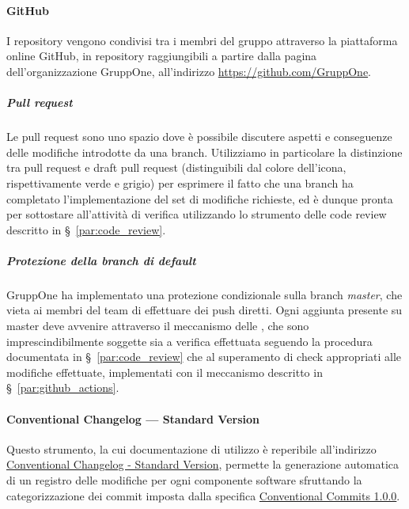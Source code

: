 \documentclass[../../norme-di-progetto.tex]{subfiles}
\begin{document}


\paragraph{GitHub}%
\label{par:github}

I repository vengono condivisi tra i membri del gruppo attraverso la piattaforma online GitHub, in repository raggiungibili a partire dalla pagina dell'organizzazione GruppOne, all'indirizzo \href{https://github.com/GruppOne}{https://github.com/GruppOne}.

\subparagraph{Pull request}%
\label{subp:pull_request}

Le pull request sono uno spazio dove è possibile discutere aspetti e conseguenze delle modifiche introdotte da una branch. Utilizziamo in particolare la distinzione tra pull request e draft pull request (distinguibili dal colore dell'icona, rispettivamente verde e grigio) per esprimere il fatto che una branch ha completato l'implementazione del set di modifiche richieste, ed è dunque pronta per sottostare all'attività di verifica utilizzando lo strumento delle code review descritto in §~\ref{par:code_review}.


\subparagraph{Protezione della branch di default}%
\label{subp:protezione_della_branch_di_default}

GruppOne ha implementato una protezione condizionale sulla branch \textit{master}, che vieta ai membri del team di effettuare dei push diretti. Ogni aggiunta presente su master deve avvenire attraverso il meccanismo delle , che sono imprescindibilmente soggette sia a verifica effettuata seguendo la procedura documentata in §~\ref{par:code_review} che al superamento di check appropriati alle modifiche effettuate, implementati con il meccanismo descritto in §~\ref{par:github_actions}.



\paragraph{Conventional Changelog --- Standard Version}%
\label{par:conventional_changelog_standard_version}

Questo strumento, la cui documentazione di utilizzo è reperibile all'indirizzo \href{https://github.com/conventional-changelog/standard-version/blob/master/README.md}{Conventional Changelog - Standard Version}, permette la generazione automatica di un registro delle modifiche per ogni componente software sfruttando la categorizzazione dei commit imposta dalla specifica \href{https://www.conventionalcommits.org/en/v1.0.0/}{Conventional Commits 1.0.0}.
\end{document}
